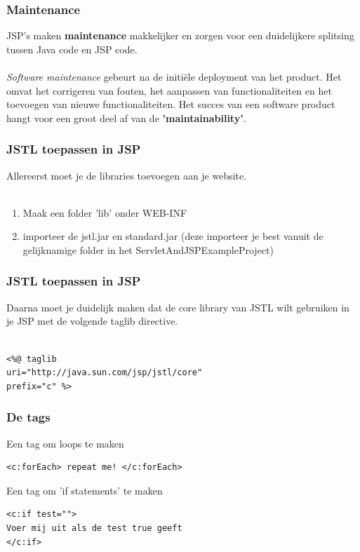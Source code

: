 \documentclass{beamer}
\begin{document}
\begin{frame}

\frametitle{Maintenance}

{\Large JSP's maken \textbf{maintenance} makkelijker en zorgen voor een duidelijkere splitsing tussen
Java code en JSP code.\\~\\

\textit{Software maintenance} gebeurt na de initi\"ele deployment van het product.
Het omvat het corrigeren van fouten, het aanpassen van functionaliteiten en het 
toevoegen van nieuwe functionaliteiten. Het succes van een software product hangt
voor een groot deel af van de \textbf{'maintainability'}. }

\end{frame}


\begin{frame}

\frametitle{JSTL toepassen in JSP}

{\Large Allereerst moet je de libraries toevoegen aan je website. \\~\\

\begin{enumerate}
  \item Maak een folder 'lib' onder WEB-INF
  \item importeer de jstl.jar en standard.jar (deze importeer je best
        vanuit de gelijknamige folder in het ServletAndJSPExampleProject)
\end{enumerate}
}

\end{frame}


\begin{frame}[fragile]

\frametitle{JSTL toepassen in JSP}

{\Large Daarna moet je duidelijk maken dat de core library van 
JSTL wilt gebruiken in je JSP met de volgende taglib directive.

\begin{verbatim} 

<%@ taglib 
uri="http://java.sun.com/jsp/jstl/core" 
prefix="c" %>

\end{verbatim}
}

\end{frame}


\begin{frame}[fragile]

\frametitle{De tags}

{\Large Een tag om loops te maken

\begin{verbatim}
<c:forEach> repeat me! </c:forEach>
\end{verbatim}

Een tag om 'if statements' te maken

\begin{verbatim}
<c:if test=""> 
Voer mij uit als de test true geeft 
</c:if>
\end{verbatim}
}

\end{frame}
\end{document}
